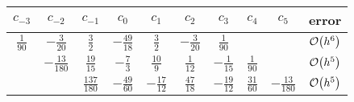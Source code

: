 \begin{tabular}{ccc|c|ccccc|r}
$c_{-3}$ & $c_{-2}$ & $c_{-1}$ & $c_{0}$ & $c_{1}$ & $c_{2}$ & $c_{3}$ & $c_{4}$ & $c_{5}$ & error \\\hline
\rule{0pt}{3ex} $\frac{1}{90}$ & $- \frac{3}{20}$ & $\frac{3}{2}$ & $- \frac{49}{18}$ & $\frac{3}{2}$ & $- \frac{3}{20}$ & $\frac{1}{90}$ &  &  & $\OO\mleft(h^{6}\mright)$ \\
\rule{0pt}{3ex}  & $- \frac{13}{180}$ & $\frac{19}{15}$ & $- \frac{7}{3}$ & $\frac{10}{9}$ & $\frac{1}{12}$ & $- \frac{1}{15}$ & $\frac{1}{90}$ &  & $\OO\mleft(h^{5}\mright)$ \\
\rule{0pt}{3ex}  &  & $\frac{137}{180}$ & $- \frac{49}{60}$ & $- \frac{17}{12}$ & $\frac{47}{18}$ & $- \frac{19}{12}$ & $\frac{31}{60}$ & $- \frac{13}{180}$ & $\OO\mleft(h^{5}\mright)$ \\
\end{tabular}

